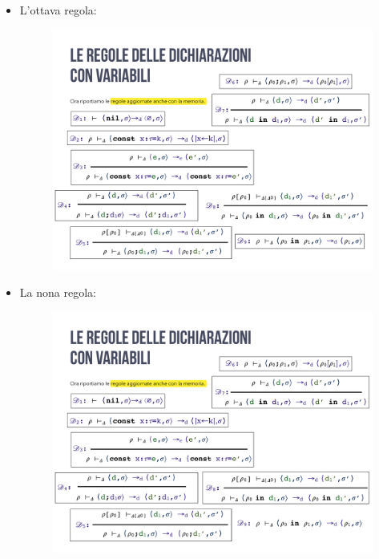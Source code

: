 \documentclass[a4paper]{article}
\begin{document}
\begin{itemize}
 		\item L'ottava regola:
 		\begin{figure}[!htp]
 			\centering
 			\includegraphics[width=.8\textwidth]{img/regola_dichiarazione-up-8.pdf}
 		\end{figure}
 	
 		\item La nona regola:
 		\begin{figure}[!htp]
 			\centering
 			\includegraphics[width=.7\textwidth]{img/regola_dichiarazione-up-9.pdf}
 		\end{figure}
 	

\end{itemize}
\end{document}
